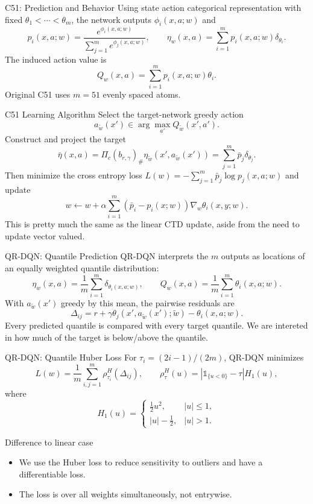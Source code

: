 \documentclass[10pt]{beamer}
\newcommand{\1}{\mathds{1}}
\begin{document}
\begin{frame}{C51: Prediction and Behavior}
  Using state action categorical representation with fixed $\theta_1<\cdots<\theta_m$, the network outputs 
  $\phi_i(x,a;w)$ and
  \[
    p_i(x,a;w)=\frac{e^{\phi_i(x,a;w)}}
    {\sum_{j=1}^m e^{\phi_j(x,a;w)}},
    \qquad
    \eta_w(x,a)=\sum_{i=1}^mp_i(x,a;w)\delta_{\theta_i}.
  \]
  The induced action value is
  \[
    Q_w(x,a)=\sum_{i=1}^mp_i(x,a;w)\theta_i.
  \]
  Original C51 uses $m=51$ evenly spaced atoms.
\end{frame}

\begin{frame}{C51 Learning Algorithm}
  Select the target-network greedy action
  \[
    a_{\widetilde w}(x')\in\arg\max_{a'}Q_{\widetilde w}(x',a').
  \]
  Construct and project the target
  \[
    \bar\eta(x,a)=
    \Pi_c(b_{r,\gamma})_\#\eta_{\widetilde w}
    (x',a_{\widetilde w}(x'))
    =\sum_{j=1}^m\bar p_j\delta_{\theta_j}.
  \]
  Then minimize the cross entropy loss $L(w)=-\sum_{j=1}^m\bar p_j\log p_j(x,a;w)$ and update
  \[
    w\leftarrow w+\alpha
    \sum_{i = 1}^{m}  (\bar p_i-p_i(x;w)) \nabla_w \theta_i(x,y ; w).
  \]
  This is pretty much the same as the linear CTD update, aside from the need to update vector valued. 
\end{frame}

\begin{frame}{QR-DQN: Quantile Prediction}
  QR-DQN interprets the $m$ outputs as locations of an equally weighted
  quantile distribution:
  \[
    \eta_w(x,a)=\frac1m\sum_{i=1}^m\delta_{\theta_i(x,a;w)},
    \qquad
    Q_w(x,a)=\frac1m\sum_{i=1}^m\theta_i(x,a;w).
  \]
  With $a_{\widetilde w}(x')$ greedy by this mean, the pairwise residuals are
  \[
    \Delta_{ij}=r+\gamma\theta_j(x',a_{\widetilde w}(x');\widetilde w)
    -\theta_i(x,a;w).
  \]
  Every predicted quantile is compared with every target quantile. We are intereted in how much of the target is below/above the quantile.
\end{frame}

\begin{frame}{QR-DQN: Quantile Huber Loss}
  For $\tau_i=(2i-1)/(2m)$, QR-DQN minimizes
  \[
    L(w)=\frac1m\sum_{i,j=1}^m\rho^H_{\tau_i}(\Delta_{ij}),
    \qquad
    \rho^H_\tau(u)=|\1_{\{u<0\}}-\tau|H_1(u),
  \]
  where
  \[
    H_1(u)=
    \begin{cases}
      \frac12u^2,&|u|\leq1,\\
      |u|-\frac12,&|u|>1.
    \end{cases}
  \]

  \begin{block}{Difference to linear case}
    \begin{itemize}
      \item We use the Huber loss to reduce sensitivity to outliers and have a differentiable loss.
      \item The loss is over all weights simultaneously, not entrywise. 
    \end{itemize}
    
  \end{block}
\end{frame}
\end{document}
